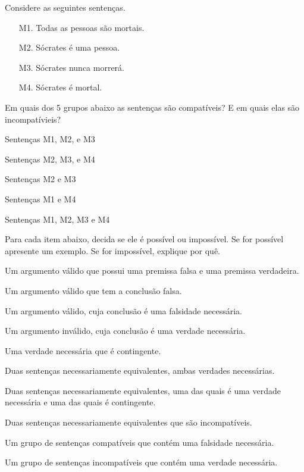 \problempart Considere as seguintes sentenças.
\begin{enumerate}%
\item[M1.] \label{itm:allmortal} Todas as pessoas são mortais.
\item[M2.] \label{itm:socperson} Sócrates é uma pessoa.
\item[M3.] \label{itm:socnotdie} Sócrates nunca morrerá.
\item[M4.] \label{itm:socmortal} Sócrates é mortal.
\end{enumerate}
Em quais dos 5 grupos abaixo as sentenças são compatíveis? E em quais elas são incompatívieis?
\begin{earg}
\item Sentenças M1, M2, e M3
\item Sentenças M2, M3, e M4
\item Sentenças M2 e M3
\item Sentenças M1 e M4
\item Sentenças M1, M2, M3 e M4
\end{earg}

\problempart
\label{pr.EnglishCombinations2}
Para cada item abaixo, decida se ele é possível ou impossível.
Se for possível apresente um exemplo.
Se for impossível, explique por quê.
\begin{earg}
\item Um argumento válido que possui uma premissa falsa e uma premissa verdadeira.

\item Um argumento válido que tem a conclusão falsa.

\item Um argumento válido, cuja conclusão é uma falsidade necessária.

\item Um argumento inválido, cuja conclusão é uma verdade necessária.

\item Uma verdade necessária que é contingente.

\item Duas sentenças necessariamente equivalentes, ambas verdades necessárias.

\item Duas sentenças necessariamente equivalentes, uma das quais é uma verdade necessária e uma das quais é contingente.

\item Duas sentenças necessariamente equivalentes que são incompatíveis.

\item Um grupo de sentenças compatíveis que contém uma falsidade necessária.

\item Um grupo de sentenças incompatíveis que contém uma verdade necessária.
\end{earg}


